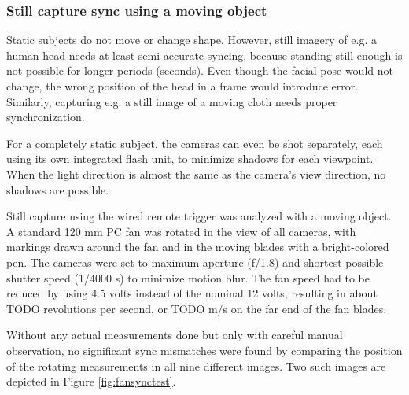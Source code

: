 \subsubsection{Still capture sync using a moving object}

Static subjects do not move or change shape.
However, still imagery of e.g. a human head needs at least semi-accurate syncing, because standing still enough is not possible for longer periods (seconds).
Even though the facial pose would not change, the wrong position of the head in a frame would introduce error.
Similarly, capturing e.g. a still image of a moving cloth needs proper synchronization.

For a completely static subject, the cameras can even be shot separately, each using its own integrated flash unit, to minimize shadows for each viewpoint.
When the light direction is almost the same as the camera's view direction, no shadows are possible.

Still capture using the wired remote trigger was analyzed with a moving object.
A standard 120 mm PC fan was rotated in the view of all cameras, with markings drawn around the fan and in the moving blades with a bright-colored pen.
The cameras were set to maximum aperture (f/1.8) and shortest possible shutter speed (1/4000 s) to minimize motion blur.
The fan speed had to be reduced by using 4.5 volts instead of the nominal 12 volts, resulting in about TODO revolutions per second, or TODO m/s on the far end of the fan blades.

Without any actual measurements done but only with careful manual observation, no significant sync mismatches were found by comparing the position of the rotating measurements in all nine different images.
Two such images are depicted in Figure \ref{fig:fansynctest}.


%


